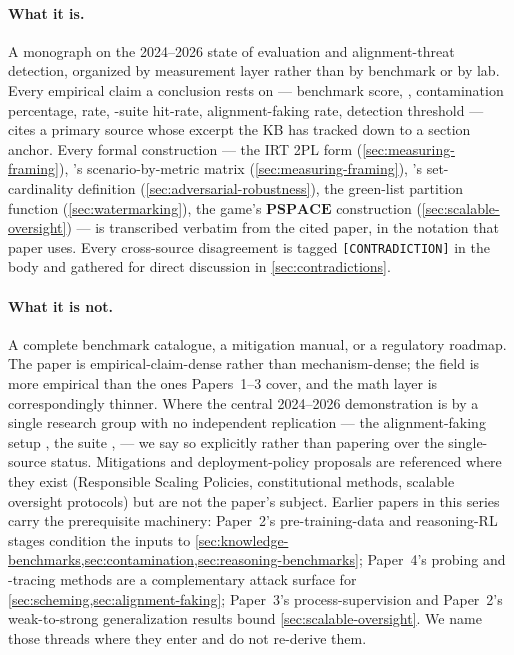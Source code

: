 \paragraph{What it is.} A monograph on the 2024--2026 state of 
evaluation and alignment-threat detection, organized by measurement
layer rather than by benchmark or by lab. Every empirical claim a
conclusion rests on --- benchmark score, , contamination percentage,
 rate, -suite hit-rate, alignment-faking rate,
 detection threshold --- cites a primary source whose
excerpt the KB has tracked down to a section anchor. Every formal
construction --- the IRT 2PL form (\cref{sec:measuring-framing}),
's scenario-by-metric matrix (\cref{sec:measuring-framing}),
's set-cardinality definition (\cref{sec:adversarial-robustness}),
the green-list partition function (\cref{sec:watermarking}), the
 game's $\mathbf{PSPACE}$ construction
(\cref{sec:scalable-oversight}) --- is transcribed verbatim from the
cited paper, in the notation that paper uses. Every cross-source
disagreement is tagged \texttt{[CONTRADICTION]} in the body and
gathered for direct discussion in \cref{sec:contradictions}.

\paragraph{What it is not.} A complete benchmark catalogue, a
mitigation manual, or a regulatory roadmap. The paper is
empirical-claim-dense rather than mechanism-dense; the field is
more empirical than the ones Papers~1--3 cover, and the math layer
is correspondingly thinner. Where the central 2024--2026
demonstration is by a single research group with no independent
replication --- the alignment-faking setup
\citep{greenblatt2024-alignment-faking}, the  suite
\citep{meinke2024-apollo-scheming}, 
\citep{glazer2024-frontiermath} --- we say so explicitly rather
than papering over the single-source status. Mitigations and
deployment-policy proposals are referenced where they exist
(Responsible Scaling Policies, constitutional methods, scalable
oversight protocols) but are not the paper's subject. Earlier
papers in this series carry the prerequisite machinery: Paper~2's
pre-training-data and reasoning-RL stages condition the inputs to
\cref{sec:knowledge-benchmarks,sec:contamination,sec:reasoning-benchmarks};
Paper~4's probing and -tracing methods are a complementary
attack surface for
\cref{sec:scheming,sec:alignment-faking}; Paper~3's
process-supervision and Paper~2's weak-to-strong generalization
results bound \cref{sec:scalable-oversight}. We name those threads
where they enter and do not re-derive them.

